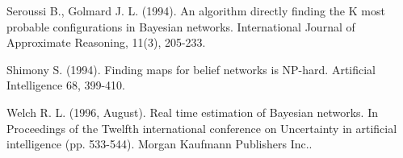\documentclass[a4paper,11pt]{article}
\begin{document}
\begin{thebibliography}{}
Seroussi B., Golmard J. L. (1994). An algorithm directly finding the K most probable configurations in Bayesian networks. International Journal of Approximate Reasoning, 11(3), 205-233.

Shimony S. (1994). Finding maps for belief networks is NP-hard. Artificial Intelligence 68, 399-410.

Welch R. L. (1996, August). Real time estimation of Bayesian networks. In Proceedings of the Twelfth international conference on Uncertainty in artificial intelligence (pp. 533-544). Morgan Kaufmann Publishers Inc..

\end{thebibliography}
\end{document}

